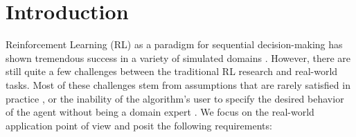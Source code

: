 \section{Introduction}
\label{sec:introduction}
Reinforcement Learning (RL) as a paradigm for sequential decision-making \citep{sutton1988learning} has shown tremendous success in a variety of simulated domains \citep{mnih2015human, silver2017mastering, OpenAI_dota}.
However, there are still quite a few challenges between the traditional RL research and real-world tasks.
Most of these challenges stem from assumptions that are rarely satisfied in practice \citep{dulac2019challenges}, or the inability of the algorithm's user to specify the desired behavior of the agent without being a domain expert \citep{Thomas2019}.
%
We focus on the real-world application point of view and posit the following requirements:
